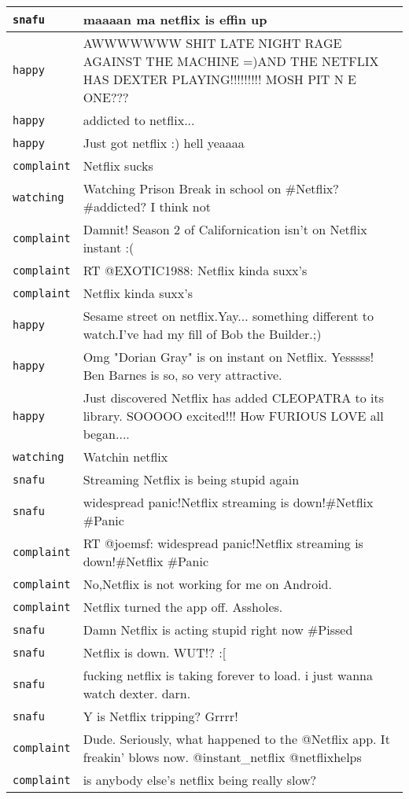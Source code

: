 {\begin{longtable}{|l|p{160mm}|}
      \tabularnewline\hline
         \texttt{snafu} & maaaan ma netflix is effin up
      \tabularnewline\hline
         \texttt{happy} & AWWWWWWW SHIT LATE NIGHT RAGE AGAINST THE MACHINE =)AND THE NETFLIX HAS DEXTER PLAYING!!!!!!!!! MOSH PIT N E ONE???
      \tabularnewline\hline
         \texttt{happy} & addicted to netflix...
      \tabularnewline\hline
         \texttt{happy} & Just got netflix :) hell yeaaaa
      \tabularnewline\hline
         \texttt{complaint} & Netflix sucks
      \tabularnewline\hline
         \texttt{watching} & Watching Prison Break in school on \#Netflix? \#addicted? I think not
      \tabularnewline\hline
         \texttt{complaint} & Damnit! Season 2 of Californication isn't on Netflix instant :(
      \tabularnewline\hline
         \texttt{complaint} & RT @EXOTIC1988: Netflix kinda suxx's
      \tabularnewline\hline
         \texttt{complaint} & Netflix kinda suxx's
      \tabularnewline\hline
         \texttt{happy} & Sesame street on netflix.Yay... something different to watch.I've had my fill of Bob the Builder.;)
      \tabularnewline\hline
         \texttt{happy} & Omg "Dorian Gray" is on instant on Netflix. Yesssss! Ben Barnes is so, so very attractive.
      \tabularnewline\hline
         \texttt{happy} & Just discovered Netflix has added CLEOPATRA to its library. SOOOOO excited!!! How FURIOUS LOVE all began....
      \tabularnewline\hline
         \texttt{watching} & Watchin netflix
      \tabularnewline\hline
         \texttt{snafu} & Streaming Netflix is being stupid again
      \tabularnewline\hline
         \texttt{snafu} & widespread panic!Netflix streaming is down!\#Netflix \#Panic
      \tabularnewline\hline
         \texttt{complaint} & RT @joemsf: widespread panic!Netflix streaming is down!\#Netflix \#Panic
      \tabularnewline\hline
         \texttt{complaint} & No,Netflix is not working for me on Android.
      \tabularnewline\hline
         \texttt{complaint} & Netflix turned the app off. Assholes.
      \tabularnewline\hline
         \texttt{snafu} & Damn Netflix is acting stupid right now \#Pissed
      \tabularnewline\hline
         \texttt{snafu} & Netflix is down. WUT!? :[
      \tabularnewline\hline
         \texttt{snafu} & fucking netflix is taking forever to load. i just wanna watch dexter. darn.
      \tabularnewline\hline
         \texttt{snafu} & Y is Netflix tripping? Grrrr!
      \tabularnewline\hline
         \texttt{complaint} & Dude. Seriously, what happened to the @Netflix app. It freakin' blows now. @instant\_netflix @netflixhelps
      \tabularnewline\hline
         \texttt{complaint} & is anybody else's netflix being really slow?

\end{longtable}}
